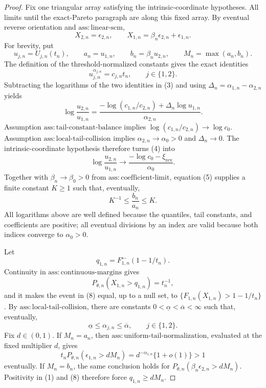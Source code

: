 \documentclass{article}
\begin{document}
\begin{proof}
Fix one triangular array satisfying the intrinsic-coordinate hypotheses. All limits until the exact-Pareto paragraph are along this fixed array. By eventual reverse orientation and \(\mathrm{ass{:}linear\text{-}scm}\),
\[
X_{2,n}=\epsilon_{2,n},
\qquad
X_{1,n}=\beta_n\epsilon_{2,n}+\epsilon_{1,n}.
\tag{1}
\]
For brevity, put
\[
u_{j,n}=U_{j,n}(t_n),
\qquad
a_n=u_{1,n},
\qquad
b_n=\beta_n u_{2,n},
\qquad
M_n=\max(a_n,b_n).
\tag{2}
\]
The definition of the threshold-normalized constants gives the exact identities
\[
u_{j,n}^{\alpha_{j,n}}=c_{j,n}t_n,
\qquad j\in\{1,2\}.
\tag{3}
\]
Subtracting the logarithms of the two identities in (3) and using \(\Delta_n=\alpha_{1,n}-\alpha_{2,n}\) yields
\[
\log\frac{u_{2,n}}{u_{1,n}}
=\frac{-\log(c_{1,n}/c_{2,n})+\Delta_n\log u_{1,n}}
{\alpha_{2,n}}.
\tag{4}
\]
Assumption \(\mathrm{ass{:}tail\text{-}constant\text{-}balance}\) implies
\(\log(c_{1,n}/c_{2,n})\to\log c_0\). Assumption
\(\mathrm{ass{:}local\text{-}tail\text{-}collision}\) implies
\(\alpha_{2,n}\to\alpha_0>0\) and \(\Delta_n\to0\). The intrinsic-coordinate hypothesis therefore turns (4) into
\[
\log\frac{u_{2,n}}{u_{1,n}}
\longrightarrow
\frac{-\log c_0-\xi_{\mathrm{rev}}}{\alpha_0}.
\tag{5}
\]
Together with \(\beta_n\to\beta_0>0\) from
\(\mathrm{ass{:}coefficient\text{-}limit}\), equation (5) supplies a finite
constant \(K\geq1\) such that, eventually,
\[
K^{-1}\leq\frac{b_n}{a_n}\leq K.
\tag{6}
\]
All logarithms above are well defined because the quantiles, tail constants, and
coefficients are positive; all eventual divisions by an index are valid because
both indices converge to \(\alpha_0>0\).

Let
\[
q_{1,n}=F_{1,n}^{\leftarrow}(1-1/t_n).
\tag{7}
\]
Continuity in \(\mathrm{ass{:}continuous\text{-}margins}\) gives
\[
P_{\theta,n}(X_{1,n}>q_{1,n})=t_n^{-1},
\tag{8}
\]
and it makes the event in (8) equal, up to a null set, to
\(\{F_{1,n}(X_{1,n})>1-1/t_n\}\). By
\(\mathrm{ass{:}local\text{-}tail\text{-}collision}\), there are constants
\(0<\underline\alpha<\overline\alpha<\infty\) such that, eventually,
\[
\underline\alpha\leq\alpha_{j,n}\leq\overline\alpha,
\qquad j\in\{1,2\}.
\tag{9}
\]
Fix \(d\in(0,1)\). If \(M_n=a_n\), then
\(\mathrm{ass{:}uniform\text{-}tail\text{-}normalization}\), evaluated at the
fixed multiplier \(d\), gives
\[
t_nP_{\theta,n}(\epsilon_{1,n}>dM_n)
=d^{-\alpha_{1,n}}\{1+o(1)\}>1
\tag{10}
\]
eventually. If \(M_n=b_n\), the same conclusion holds for
\(P_{\theta,n}(\beta_n\epsilon_{2,n}>dM_n)\). Positivity in (1) and (8)
therefore force \(q_{1,n}\geq dM_n\).


\end{proof}
\end{document}
